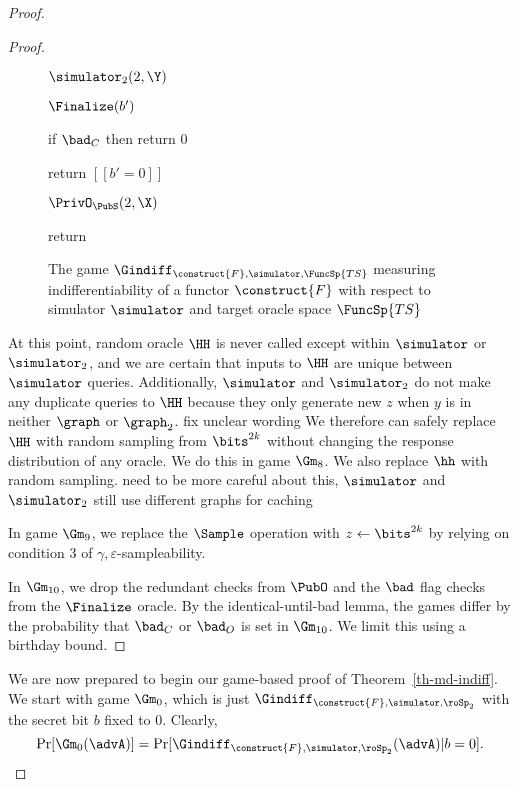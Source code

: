 \begin{proof}
\begin{proof}
\begin{figure}
{\begin{algorithm}{$\simulator_2(2,\Y)$}
			\end{algorithm}
		\ExptSepSpace
		\begin{algorithm}{$\Finalize(b')$}
			\item if $\bad_C$  then return $0$
			\item return $[[b' = 0]]$
		\end{algorithm}
		\begin{algorithm}{$\PrivO_{\PubS}(2, \X)$}
			\item return 
		\end{algorithm}	
			}
			\vspace{5pt}
			\caption{The game  $\Gindiff_{\construct{F}, \simulator, \FuncSp{TS}}$ measuring indifferentiability of a functor $\construct{F}$ with respect to simulator $\simulator$ and target oracle space $\FuncSp{TS}$}
			\label{fig-lemma-gm7}
		\end{figure}
	
		At this point, random oracle $\HH$ is never called except within $\simulator$ or $\simulator_2$, and we are certain that inputs to $\HH$ are unique between $\simulator$ queries. Additionally, $\simulator$ and $\simulator_2$ do not make any duplicate queries to $\HH$ because they only generate new $z$ when $y$ is in neither $\graph$ or $\graph_2$.{\color{red} fix unclear wording} We therefore can safely replace $\HH$ with random sampling from $\bits^{2k}$ without changing the response distribution of any oracle. We do this in game $\Gm_8$. We also replace $\hh$ with random sampling. {\color{red} need to be more careful about this, $\simulator$ and $\simulator_2$ still use different graphs for caching}
		
		In game $\Gm_9$, we replace the $\Sample$ operation with $z \gets \bits^{2k}$ by relying on condition $3$ of $\gamma, \varepsilon$-sampleability. 
		
		In $\Gm_{10}$, we drop the redundant checks from $\PubO$ and the $\bad$ flag checks from the $\Finalize$ oracle. By the identical-until-bad lemma, the games differ by the probability that $\bad_C$ or $\bad_O$ is set in $\Gm_{10}$. We limit this using a birthday bound.  
	\end{proof}
	
	We are now prepared to begin our game-based proof of Theorem~\ref{th-md-indiff}. We start with game $\Gm_0$, which is just $\Gindiff_{\construct{F}, \simulator, \roSp_2}$ with the secret bit $b$ fixed to $0$. Clearly, 
	\[\Pr[\Gm_0(\advA)] = \Pr[\Gindiff_{\construct{F}, \simulator, \roSp_2}(\advA) | b = 0].\]
	

\end{proof}
